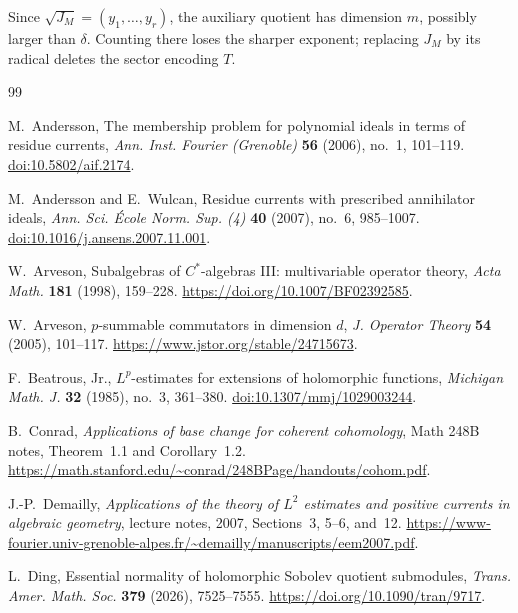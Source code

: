 \documentclass[11pt,reqno]{amsart}
\theoremstyle{remark}
\begin{document}
Since $\sqrt{J_M}=(y_1,\ldots,y_r)$, the auxiliary quotient has
dimension $m$, possibly larger than $\delta$. Counting there loses the sharper exponent;
 replacing $J_M$ by its radical deletes the
sector encoding $T$.



\begin{thebibliography}{99}

M.~Andersson, The membership problem for polynomial ideals in
terms of residue currents, \emph{Ann. Inst. Fourier (Grenoble)}
\textbf{56} (2006), no.~1, 101--119.
\href{https://doi.org/10.5802/aif.2174}{doi:10.5802/aif.2174}.

M.~Andersson and E.~Wulcan, Residue currents with prescribed
annihilator ideals, \emph{Ann. Sci. \'Ecole Norm. Sup. (4)}
\textbf{40} (2007), no.~6, 985--1007.
\href{https://doi.org/10.1016/j.ansens.2007.11.001}{doi:10.1016/j.ansens.2007.11.001}.

W.~Arveson, Subalgebras of $C^*$-algebras III: multivariable operator
theory, \emph{Acta Math.} \textbf{181} (1998), 159--228.
\url{https://doi.org/10.1007/BF02392585}.


W.~Arveson, $p$-summable commutators in dimension $d$,
\emph{J. Operator Theory} \textbf{54} (2005), 101--117.
\url{https://www.jstor.org/stable/24715673}.


F.~Beatrous, Jr., $L^p$-estimates for extensions of holomorphic
functions, \emph{Michigan Math. J.} \textbf{32} (1985), no.~3,
361--380.
\href{https://doi.org/10.1307/mmj/1029003244}{doi:10.1307/mmj/1029003244}.

B.~Conrad, \emph{Applications of base change for coherent cohomology},
Math 248B notes, Theorem~1.1 and Corollary~1.2.
\url{https://math.stanford.edu/~conrad/248BPage/handouts/cohom.pdf}.

J.-P.~Demailly, \emph{Applications of the theory of $L^2$ estimates
and positive currents in algebraic geometry}, lecture notes, 2007,
Sections~3, 5--6, and~12. 
\url{https://www-fourier.univ-grenoble-alpes.fr/~demailly/manuscripts/eem2007.pdf}.

L.~Ding, {Essential normality of holomorphic Sobolev quotient submodules}, \emph{Trans. Amer. Math. Soc.} \textbf{379} (2026), 7525–7555. \url{https://doi.org/10.1090/tran/9717}.



\end{thebibliography}
\end{document}
